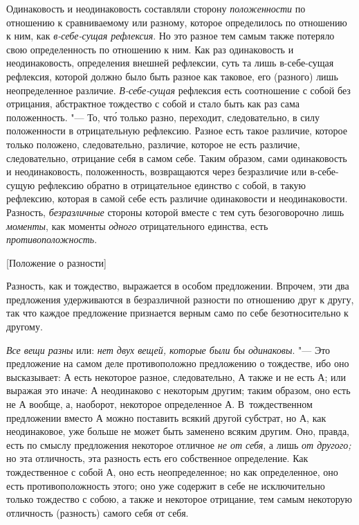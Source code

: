Одинаковость и неодинаковость составляли сторону
{\em положенности} по отношению к сравниваемому или
разному, которое определилось по отношению к ним, как
{\em в-себе-сущая рефлексия}. Но это разное тем самым
также потеряло свою определенность по отношению к ним. Как раз одинаковость
и неодинаковость, определения внешней рефлексии, суть та лишь в-себе-сущая
рефлексия, которой должно было быть разное как таковое, его (разного) лишь
неопределенное различие. {\em В-себе-сущая} рефлексия
есть соотношение с собой без отрицания, абстрактное тождество с собой и
стало быть как раз сама положенность. "--- То, чт\'{о} только разно, переходит,
следовательно, в силу положенности в отрицательную рефлексию. Разное есть
такое различие, которое только положено, следовательно, различие, которое
не есть различие, следовательно, отрицание себя в самом себе. Таким
образом, сами одинаковость и неодинаковость, положенность, возвращаются
через безразличие или в-себе-сущую рефлексию обратно в отрицательное
единство с собой, в такую рефлексию, которая в самой себе есть различие
одинаковости и неодинаковости. Разность,
{\em безразличные} стороны которой вместе с тем суть
безоговорочно лишь {\em моменты}, как моменты
{\em одного} отрицательного единства, есть {\em противоположность}.

%
  {[Положение о разности]}

Разность, как и тождество, выражается в особом предложении. Впрочем, эти два
предложения удерживаются в безразличной разности по отношению друг к другу,
так что каждое предложение признается верным само по себе безотносительно к
другому.

{\em Все вещи разны} или: {\em нет
двух вещей, которые были бы одинаковы}. "--- Это предложение на самом деле
противоположно предложению о тождестве, ибо оно высказывает: $А$
есть некоторое разное, следовательно, $А$ также и не есть
$А$; или выражая это иначе: $А$ неодинаково с некоторым
другим; таким образом, оно есть не $А$ вообще, а, наоборот,
некоторое определенное $А$. В~тождественном предложении вместо
$А$ можно поставить всякий другой субстрат, но $А$, как
неодинаковое, уже больше не может быть заменено всяким другим. Оно, правда,
есть по смыслу предложения некоторое отличное {\em не от себя},
а лишь {\em от другого;} но эта отличность,
эта разность есть его собственное определение. Как тождественное с собой
$А$, оно есть неопределенное; но как определенное, оно есть
противоположность этого; оно уже содержит в себе не исключительно только
тождество с собою, а также и некоторое отрицание, тем самым некоторую
отличность (разность) самого себя от себя.

